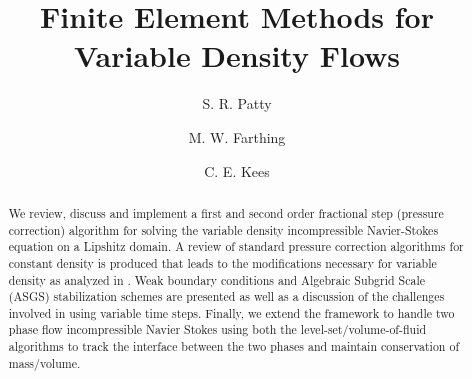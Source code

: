 \documentclass[letterpaper]{erdc}
\begin{document}
\frontmatter


\title{Finite Element Methods for Variable Density Flows}

\author{S. R. Patty}

\author{M. W. Farthing \and C. E. Kees}

%
%




\begin{abstract}
  We review, discuss and implement a first and second order fractional step
  (pressure correction) algorithm for solving the variable density
  incompressible Navier-Stokes equation on a Lipshitz domain.  A review of
  standard pressure correction algorithms for constant density is produced that
  leads to the modifications necessary for variable density as analyzed in
  \cite{guermond2011error}.  Weak boundary conditions and Algebraic Subgrid
  Scale (ASGS) stabilization schemes are presented as well as a discussion of
  the challenges involved in using variable time steps. Finally, we extend the
  framework to handle two phase flow incompressible Navier Stokes using both
  the level-set/volume-of-fluid algorithms to track the interface between the
  two phases and maintain conservation of mass/volume.
\end{abstract}

\end{document}
